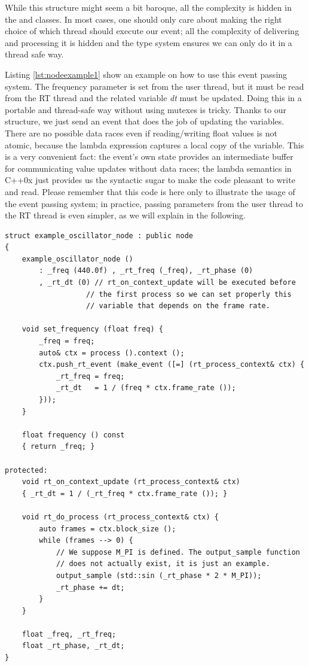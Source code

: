 While this structure might seem a bit baroque, all the complexity is
hidden in the  and 
classes. In most cases, one should only care about making the right
choice of which thread should execute our event; all the complexity of
delivering and processing it is hidden and the type system ensures
we can only do it in a thread safe way.

Listing \ref{lst:nodeexample1} show an example on how to use this
event passing system. The frequency parameter is set from the user
thread, but it must be read from the RT thread and the related
variable \emph{dt} must be updated. Doing this in a portable and
thread-safe way without using mutexes is tricky. Thanks to our
structure, we just send an event that does the job of updating the
variables. There are no possible data races even if reading/writing
float values is not atomic, because the lambda expression captures a
local copy of the  variable. This is a very convenient
fact: the event's own state provides an intermediate buffer for
communicating value updates without data races; the lambda semantics
in C++0x just provides us the syntactic sugar to make the code
pleasant to write and read. Please remember that this code is here
only to illustrate the usage of the event passing system; in practice,
passing parameters from the user thread to the RT thread is even
simpler, as we will explain in the following.


\begin{lstlisting}[float=h!, label=lst:nodeexample1, caption=A thread communication use-case]
struct example_oscillator_node : public node
{
    example_oscillator_node ()
        : _freq (440.0f) , _rt_freq (_freq), _rt_phase (0)
        , _rt_dt (0) // rt_on_context_update will be executed before
                   // the first process so we can set properly this
                   // variable that depends on the frame rate.
    
    void set_frequency (float freq) {
        _freq = freq;
        auto& ctx = process ().context ();
        ctx.push_rt_event (make_event ([=] (rt_process_context& ctx) {
            _rt_freq = freq;
            _rt_dt   = 1 / (freq * ctx.frame_rate ());
        }));
    }

    float frequency () const
    { return _freq; }

protected:
    void rt_on_context_update (rt_process_context& ctx)
    { _rt_dt = 1 / (_rt_freq * ctx.frame_rate ()); }

    void rt_do_process (rt_process_context& ctx) {
        auto frames = ctx.block_size ();
        while (frames --> 0) {
            // We suppose M_PI is defined. The output_sample function
            // does not actually exist, it is just an example.
            output_sample (std::sin (_rt_phase * 2 * M_PI));
            _rt_phase += dt;
        }
    }

    float _freq, _rt_freq;
    float _rt_phase, _rt_dt;
}
\end{lstlisting}


